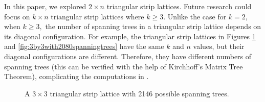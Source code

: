 \documentclass{amsart}
\theoremstyle{definition}
\newcommand{\longnguyen}[1]
{\marginpar{\tiny \color{purple} Long: #1}}
\begin{document}
\par

In this paper, we explored $2 \times n$ triangular strip lattices. Future research could focus on $k \times n$ triangular strip lattices where $k \geq 3$. Unlike the case for $k = 2,$ when $k \ge 3,$ the number of spanning trees in a triangular strip lattice depends on its diagonal configuration. For example,  the triangular strip lattices in Figures \ref{fig:3by3with2146spanningtrees} and \ref{fig:3by3with2080spanningtrees} have the same $k$ and $n$ values, but their diagonal configurations are different. Therefore, they have different numbers of spanning trees ({this can be verified with the help of Kirchhoff's Matrix Tree Theorem}), complicating the computations in .
\begin{figure}[H]
    \centering
    \caption{A $3 \times 3$ triangular strip lattice with 2146 possible spanning trees.}
    \label{fig:3by3with2146spanningtrees}
\end{figure}
\end{document}
